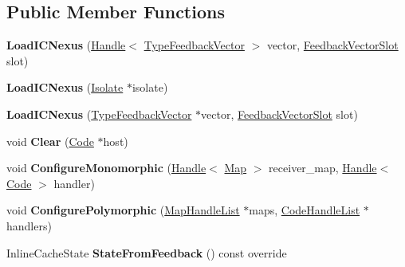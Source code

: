 \subsection*{Public Member Functions}
\begin{DoxyCompactItemize}
\item 
{\bfseries Load\+I\+C\+Nexus} (\hyperlink{classv8_1_1internal_1_1_handle}{Handle}$<$ \hyperlink{classv8_1_1internal_1_1_type_feedback_vector}{Type\+Feedback\+Vector} $>$ vector, \hyperlink{classv8_1_1internal_1_1_feedback_vector_slot}{Feedback\+Vector\+Slot} slot)\hypertarget{classv8_1_1internal_1_1_load_i_c_nexus_a47ea60370a03be9d25919651c9f1d0b4}{}\label{classv8_1_1internal_1_1_load_i_c_nexus_a47ea60370a03be9d25919651c9f1d0b4}

\item 
{\bfseries Load\+I\+C\+Nexus} (\hyperlink{classv8_1_1internal_1_1_isolate}{Isolate} $\ast$isolate)\hypertarget{classv8_1_1internal_1_1_load_i_c_nexus_aada9c4ce44b6006a26881958d22f639e}{}\label{classv8_1_1internal_1_1_load_i_c_nexus_aada9c4ce44b6006a26881958d22f639e}

\item 
{\bfseries Load\+I\+C\+Nexus} (\hyperlink{classv8_1_1internal_1_1_type_feedback_vector}{Type\+Feedback\+Vector} $\ast$vector, \hyperlink{classv8_1_1internal_1_1_feedback_vector_slot}{Feedback\+Vector\+Slot} slot)\hypertarget{classv8_1_1internal_1_1_load_i_c_nexus_af03f7c49bdb90699e45953a53f8eef62}{}\label{classv8_1_1internal_1_1_load_i_c_nexus_af03f7c49bdb90699e45953a53f8eef62}

\item 
void {\bfseries Clear} (\hyperlink{classv8_1_1internal_1_1_code}{Code} $\ast$host)\hypertarget{classv8_1_1internal_1_1_load_i_c_nexus_af65e97cc74b6f9eab53c72b2c053cfb3}{}\label{classv8_1_1internal_1_1_load_i_c_nexus_af65e97cc74b6f9eab53c72b2c053cfb3}

\item 
void {\bfseries Configure\+Monomorphic} (\hyperlink{classv8_1_1internal_1_1_handle}{Handle}$<$ \hyperlink{classv8_1_1internal_1_1_map}{Map} $>$ receiver\+\_\+map, \hyperlink{classv8_1_1internal_1_1_handle}{Handle}$<$ \hyperlink{classv8_1_1internal_1_1_code}{Code} $>$ handler)\hypertarget{classv8_1_1internal_1_1_load_i_c_nexus_ad608ca5d1cf36ded8b5b38039b40fe6a}{}\label{classv8_1_1internal_1_1_load_i_c_nexus_ad608ca5d1cf36ded8b5b38039b40fe6a}

\item 
void {\bfseries Configure\+Polymorphic} (\hyperlink{classv8_1_1internal_1_1_list}{Map\+Handle\+List} $\ast$maps, \hyperlink{classv8_1_1internal_1_1_list}{Code\+Handle\+List} $\ast$handlers)\hypertarget{classv8_1_1internal_1_1_load_i_c_nexus_a3734374a083aabca6fe88a95b892d32b}{}\label{classv8_1_1internal_1_1_load_i_c_nexus_a3734374a083aabca6fe88a95b892d32b}

\item 
Inline\+Cache\+State {\bfseries State\+From\+Feedback} () const  override\hypertarget{classv8_1_1internal_1_1_load_i_c_nexus_a57cb56af437f935963b657444f9d82e2}{}\label{classv8_1_1internal_1_1_load_i_c_nexus_a57cb56af437f935963b657444f9d82e2}

\end{DoxyCompactItemize}
